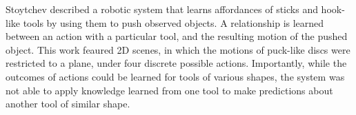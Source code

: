 Stoytchev \cite{Stoytchev_affordances_2008} described a robotic system
that learns affordances of sticks and hook-like tools by using them to
push observed objects.  A relationship is learned between an action
with a particular tool, and the resulting motion of the pushed
object. This work feaured 2D scenes, in which the motions of
puck-like discs were restricted to a plane, under four discrete
possible actions.
Importantly, while the outcomes of actions could be learned for tools
of various shapes, the system was not able to apply knowledge
learned from one tool to make predictions about another tool of similar shape.


